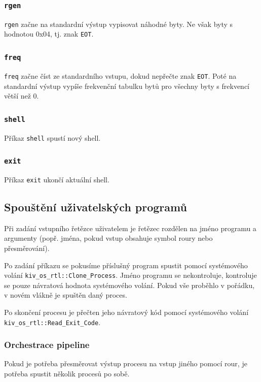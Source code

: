 \documentclass[12pt, a4paper]{article}
\begin{document}
    \subsubsection*{\texttt{rgen}}
    \texttt{rgen} začne na standardní výstup vypisovat náhodné byty. Ne však byty s hodnotou 0x04, tj. znak \texttt{EOT}.
    
    \subsubsection*{\texttt{freq}}
    \texttt{freq} začne číst ze standardního vstupu, dokud nepřečte znak \texttt{EOT}. Poté na standardní výstup vypíše frekvenční tabulku bytů pro všechny byty s frekvencí větší než 0.
    
    \subsubsection*{\texttt{shell}}
    Příkaz \texttt{shell} spustí nový shell.
    
    \subsubsection*{\texttt{exit}}
    Příkaz \texttt{exit} ukončí aktuální shell.
	
	
	\subsection{Spouštění uživatelských programů}
	Při zadání vstupního řetězce uživatelem je řetězec rozdělen na jméno programu a argumenty (popř. jména, pokud vstup obsahuje symbol roury nebo přesměrování).	
	
	
	Po zadání příkazu se pokusíme příslušný program spustit pomocí systémového volání \texttt{kiv\_os\_rtl::Clone\_Process}. Jméno programu se nekontroluje, kontroluje se pouze návratová hodnota systémového volání. Pokud vše proběhlo v pořádku, v novém vlákně je spuštěn daný proces.
	
	Po skončení procesu je přečten jeho návratový kód pomocí systémového volání \texttt{kiv\_os\_rtl::Read\_Exit\_Code}.
	
	\subsubsection{Orchestrace pipeline} 
	Pokud je potřeba přesměrovat výstup procesu na vstup jiného pomocí rour, je potřeba spustit několik procesů po sobě. 
\end{document}
